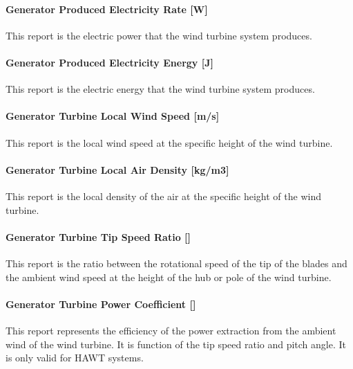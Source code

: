 \paragraph{Generator Produced Electricity Rate {[}W{]}}\label{generator-produced-electric-power-w-4}

This report is the electric power that the wind turbine system produces.

\paragraph{Generator Produced Electricity Energy {[}J{]}}\label{generator-produced-electric-energy-j-4}

This report is the electric energy that the wind turbine system produces.

\paragraph{Generator Turbine Local Wind Speed {[}m/s{]}}\label{generator-turbine-local-wind-speed-ms}

This report is the local wind speed at the specific height of the wind turbine.

\paragraph{Generator Turbine Local Air Density {[}kg/m3{]}}\label{generator-turbine-local-air-density-kgm3}

This report is the local density of the air at the specific height of the wind turbine.

\paragraph{Generator Turbine Tip Speed Ratio {[]}}\label{generator-turbine-tip-speed-ratio}

This report is the ratio between the rotational speed of the tip of the blades and the ambient wind speed at the height of the hub or pole of the wind turbine.

\paragraph{Generator Turbine Power Coefficient {[]}}\label{generator-turbine-power-coefficient}

This report represents the efficiency of the power extraction from the ambient wind of the wind turbine. It is function of the tip speed ratio and pitch angle. It is only valid for HAWT systems.


